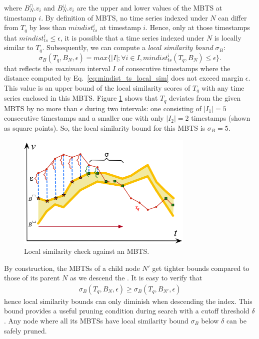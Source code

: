 \noindent where $B_{N}^{\sqcap}.v_i$ and $B_{N}^{\sqcup}.v_i$ are the upper and lower values of the MBTS at timestamp $i$. By definition of MBTS, no time series indexed under $N$ can differ from $T_q$ by less than $mindist_{ts}^i$ at timestamp $i$. Hence, only at those timestamps that $mindist_{ts}^i \leq \epsilon$, it is possible that a time series indexed under $N$ is locally similar to $T_q$. Subsequently, we can compute a {\em local similarity bound} $\sigma_B$:
\begin{equation}
\sigma_{B}(T_q, B_N, \epsilon) = max\{|I|; \forall i \in I, mindist^i_{ts}(T_q, B_N) \leq \epsilon\}.
\label{eq:sim_bound}
\end{equation}
\noindent that reflects the {\em maximum} interval $I$ of consecutive timestamps where the distance computed by Eq.~\ref{eq:mindist_ts_local_sim} does not exceed margin $\epsilon$. 
This value is an upper bound of the local similarity scores of $T_q$ with any time series enclosed in this MBTS. Figure \ref{fig:sim_mbts} shows that $T_q$ deviates from the given MBTS by no more than $\epsilon$ during two intervals: one consisting of $|I_1|=5$ consecutive timestamps and a smaller one with only $|I_2|=2$ timestamps (shown as square points). So, the local similarity bound for this MBTS is $\sigma_{B}=5$.

\begin{figure}[!tb]
    \centering
    \includegraphics[width=0.75\textwidth]{Figures/sim_mbts.png}
    \caption{Local similarity check against an MBTS.}
    \label{fig:sim_mbts}
\end{figure}

By construction, the MBTSs of a child node $N'$ get tighter bounds compared to those of its parent $N$ as we descend the \btsr. It is easy to verify that 
\begin{equation}
\begin{split}
\sigma_{B}(T_q, B_N, \epsilon) \geq \sigma_{B}(T_q, B_{N'}, \epsilon)
\end{split}
\label{eq:maxdur_ts}
\end{equation}
\noindent hence local similarity bounds can only diminish when descending the index. This bound provides a useful pruning condition during search with a cutoff threshold $\delta$. Any node where all its MBTSs have local similarity bound $\sigma_{B}$ below $\delta$ can be safely pruned.

